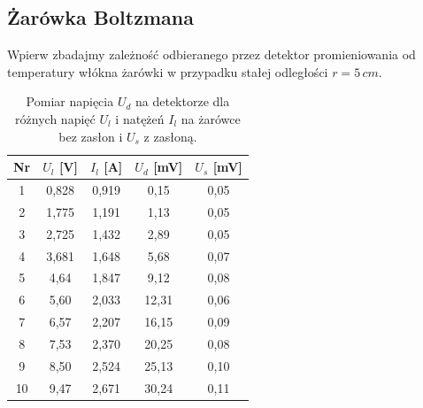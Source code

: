 \documentclass[12pt]{article}
\begin{document}
\subsection{Żarówka Boltzmana}
Wpierw zbadajmy zależność odbieranego przez detektor promieniowania od temperatury włókna żarówki w przypadku stałej odległości $r = 5 \, cm$.
\begin{table}[H]
    \centering
    \begin{tabular}{c|cc|c|c}
        \toprule
        Nr & $U_{l}$ [V] & $I_{l}$ [A] & $U_{d}$ [mV] & $U_{s}$ [mV] \\
        \midrule
        1  & 0{,}828 & 0{,}919 & 0{,}15 & 0{,}05 \\
        2  & 1{,}775 & 1{,}191 & 1{,}13 & 0{,}05 \\
        3  & 2{,}725 & 1{,}432 & 2{,}89 & 0{,}05 \\
        4  & 3{,}681 & 1{,}648 & 5{,}68 & 0{,}07 \\
        5  & 4{,}64  & 1{,}847 & 9{,}12 & 0{,}08 \\
        6  & 5{,}60  & 2{,}033 & 12{,}31 & 0{,}06 \\
        7  & 6{,}57  & 2{,}207 & 16{,}15 & 0{,}09 \\
        8  & 7{,}53  & 2{,}370 & 20{,}25 & 0{,}08 \\
        9  & 8{,}50  & 2{,}524 & 25{,}13 & 0{,}10 \\
        10 & 9{,}47  & 2{,}671 & 30{,}24 & 0{,}11 \\
        \bottomrule
    \end{tabular}
    \caption{Pomiar napięcia $U_d$ na detektorze dla różnych napięć $U_l$ i natężeń $I_l$ na żarówce bez zasłon i $U_s$ z zasłoną.}
    \label{tab:temp_measurements}
\end{table}
\end{document}
